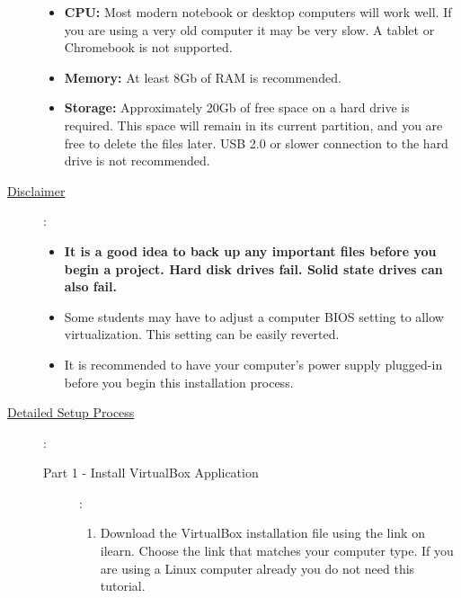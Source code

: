 \documentclass[12pt]{article}
\begin{document}
\begin{description}
		        \begin{itemize}

					\item {\bf CPU:} Most modern notebook or desktop computers will work well. If you are using a very old computer it may be very slow. A tablet or Chromebook is not supported.
					\item {\bf Memory:} At least 8Gb of RAM is recommended.        
                    \item {\bf Storage:} Approximately 20Gb of free space on a hard drive is required. This space will remain in its current partition, and you are free to delete the files later. USB 2.0 or slower connection to the hard drive is not recommended. 
    
                \end{itemize}
                
			\item[\underline{Disclaimer}]: 
			\begin{itemize}
			
				\item {\bf \R It is a good idea to back up any important files before you begin a project. Hard disk drives fail. Solid state drives can also fail. } 
				\item Some students may have to adjust a computer BIOS setting to allow virtualization. This setting can be easily reverted.   
				\item It is recommended to have your computer's power supply plugged-in before you begin this installation process. 
			
			\end{itemize} 			
			
			
                    
  

\newpage

\item[\underline{Detailed Setup Process}]: 

\begin{description} 
	

\item [Part 1 - Install VirtualBox Application]: \vspace{0mm}\\ 


\begin{enumerate}[label=\alph*)]
	
	\item Download the VirtualBox installation file using the link on ilearn. Choose the link that matches your computer type. If you are using a Linux computer already you do not need this tutorial. \vspace{5mm}
	

\end{enumerate}
\end{description}
\end{description}
\end{document}
